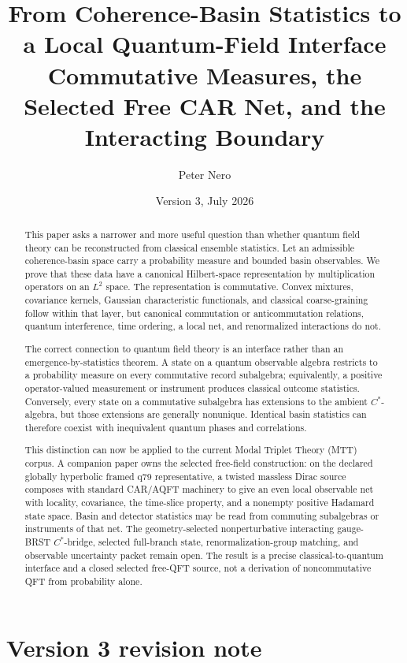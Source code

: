 \documentclass[11pt]{article}
\title{\textbf{From Coherence-Basin Statistics to a Local Quantum-Field Interface}\\
\large Commutative Measures, the Selected Free CAR Net, and the Interacting Boundary}
\author{Peter Nero}
\date{Version 3, July 2026}
\begin{document}
\maketitle

\begin{abstract}
This paper asks a narrower and more useful question than whether quantum
field theory can be reconstructed from classical ensemble statistics.  Let
an admissible coherence-basin space carry a probability measure and bounded
basin observables.  We prove that these data have a canonical Hilbert-space
representation by multiplication operators on an \(L^2\) space.  The
representation is commutative.  Convex mixtures, covariance kernels,
Gaussian characteristic functionals, and classical coarse-graining follow
within that layer, but canonical commutation or anticommutation relations,
quantum interference, time ordering, a local net, and renormalized
interactions do not.

The correct connection to quantum field theory is an interface rather than
an emergence-by-statistics theorem.  A state on a quantum observable algebra
restricts to a probability measure on every commutative record subalgebra;
equivalently, a positive operator-valued measurement or instrument produces
classical outcome statistics.  Conversely, every state on a commutative
subalgebra has extensions to the ambient \(C^*\)-algebra, but those
extensions are generally nonunique.  Identical basin statistics can
therefore coexist with inequivalent quantum phases and correlations.

This distinction can now be applied to the current Modal Triplet Theory
(MTT) corpus.  A companion paper owns the selected free-field construction:
on the declared globally hyperbolic framed q79 representative, a twisted
massless Dirac source composes with standard CAR/AQFT machinery to give an
even local observable net with locality, covariance, the time-slice
property, and a nonempty positive Hadamard state space.  Basin and detector
statistics may be read from commuting subalgebras or instruments of that
net.  The geometry-selected nonperturbative interacting gauge-BRST
\(C^*\)-bridge, selected full-branch state, renormalization-group matching,
and observable uncertainty packet remain open.  The result is a precise
classical-to-quantum interface and a closed selected free-QFT source, not a
derivation of noncommutative QFT from probability alone.
\end{abstract}

\section*{Version 3 revision note}
\end{document}
